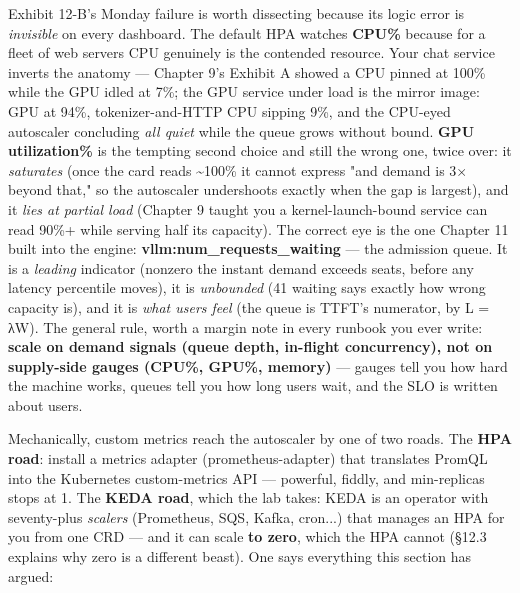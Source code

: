 Exhibit 12-B's Monday failure is worth dissecting because its logic error is \textit{invisible} on every dashboard. The default HPA watches \textbf{CPU\%} because for a fleet of web servers CPU genuinely is the contended resource. Your chat service inverts the anatomy — Chapter 9's Exhibit A showed a CPU pinned at 100\% while the GPU idled at 7\%; the GPU service under load is the mirror image: GPU at 94\%, tokenizer-and-HTTP CPU sipping 9\%, and the CPU-eyed autoscaler concluding \textit{all quiet} while the queue grows without bound. \textbf{GPU utilization\%} is the tempting second choice and still the wrong one, twice over: it \textit{saturates} (once the card reads \textasciitilde{}100\% it cannot express "and demand is 3× beyond that," so the autoscaler undershoots exactly when the gap is largest), and it \textit{lies at partial load} (Chapter 9 taught you a kernel-launch-bound service can read 90\%+ while serving half its capacity). The correct eye is the one Chapter 11 built into the engine: \textbf{vllm:num\_requests\_waiting} — the admission queue. It is a \textit{leading} indicator (nonzero the instant demand exceeds seats, before any latency percentile moves), it is \textit{unbounded} (41 waiting says exactly how wrong capacity is), and it is \textit{what users feel} (the queue is TTFT's numerator, by L = λW). The general rule, worth a margin note in every runbook you ever write: \textbf{scale on demand signals (queue depth, in-flight concurrency), not on supply-side gauges (CPU\%, GPU\%, memory)} — gauges tell you how hard the machine works, queues tell you how long users wait, and the SLO is written about users.

Mechanically, custom metrics reach the autoscaler by one of two roads. The \textbf{HPA road}: install a metrics adapter (prometheus-adapter) that translates PromQL into the Kubernetes custom-metrics API — powerful, fiddly, and min-replicas stops at 1. The \textbf{KEDA road}, which the lab takes: KEDA is an operator with seventy-plus \textit{scalers} (Prometheus, SQS, Kafka, cron...) that manages an HPA for you from one CRD — and it can scale \textbf{to zero}, which the HPA cannot (§12.3 explains why zero is a different beast). One  says everything this section has argued:

